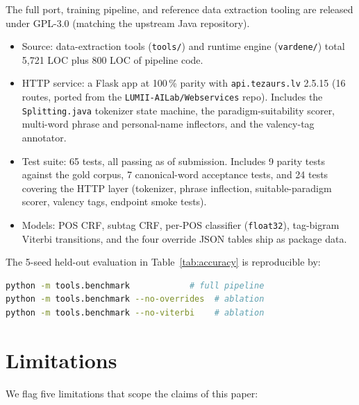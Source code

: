 \documentclass[11pt,a4paper]{article}
\begin{document}
The full port, training pipeline, and reference data extraction tooling are
released under GPL-3.0 (matching the upstream Java repository).
\begin{itemize}
\item Source: data-extraction tools (\texttt{tools/}) and runtime engine
  (\texttt{vardene/}) total 5{,}721 LOC plus 800 LOC of pipeline code.
\item HTTP service: a Flask app at 100\,\% parity with
  \texttt{api.tezaurs.lv} 2.5.15 (16 routes, ported from the
  \texttt{LUMII-AILab/Webservices} repo). Includes the
  \texttt{Splitting.java} tokenizer state machine, the
  paradigm-suitability scorer, multi-word phrase and personal-name
  inflectors, and the valency-tag annotator.
\item Test suite: 65 tests, all passing as of submission. Includes 9
  parity tests against the gold corpus, 7 canonical-word acceptance
  tests, and 24 tests covering the HTTP layer (tokenizer, phrase
  inflection, suitable-paradigm scorer, valency tags, endpoint smoke
  tests).
\item Models: POS CRF, subtag CRF, per-POS classifier (\texttt{float32}),
  tag-bigram Viterbi transitions, and the four override JSON tables ship as
  package data.
\end{itemize}

The 5-seed held-out evaluation in Table~\ref{tab:accuracy} is reproducible by:
\begin{lstlisting}[language=bash]
python -m tools.benchmark            # full pipeline
python -m tools.benchmark --no-overrides  # ablation
python -m tools.benchmark --no-viterbi    # ablation
\end{lstlisting}

\section{Limitations}\label{sec:limitations}

We flag five limitations that scope the claims of this paper:
\end{document}
